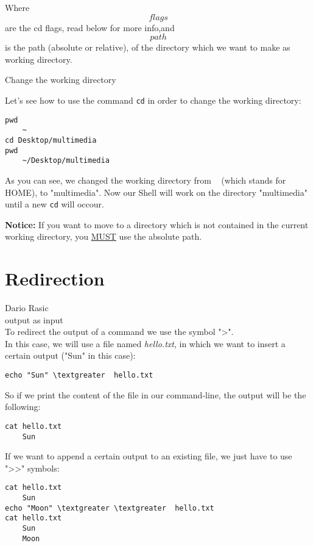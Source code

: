 \documentclass[hidelinks,12pt,a4paper,numbers=enddot]{scrartcl}
\begin{document}
Where \[flags\] are the cd flags, read below for more info,and \[path\] is the
path (absolute or relative), of the directory which we  want to make as working directory.


Change the working directory


Let's see how to use the command \texttt{cd} in order to change the working directory:


\begin{verbatim}
pwd
    ~
cd Desktop/multimedia
pwd
    ~/Desktop/multimedia
\end{verbatim}



As you can see, we changed the working directory from ~ (which stands for HOME),
to "multimedia". Now our Shell will work on the  directory "multimedia"
until a new \texttt{cd} will occour.



\textbf{Notice:} If you want to move to a directory which is not contained in the
current working directory, you \underline{MUST} use the absolute path.


\section{Redirection}


\large Dario Rasic \normalsize\\


output as input
\\
To redirect the output of a command we use the symbol "\textgreater ".\\

In this case, we will use a file named \emph{hello.txt}, in which we want to insert
a certain output ("Sun" in this case):\\

\begin{verbatim}
echo "Sun" \textgreater  hello.txt
\end{verbatim}

So if we print the content of the file in our command-line, the output will be the following:

\begin{verbatim}
cat hello.txt
    Sun
\end{verbatim}

If we want to append a certain output to an existing file,
we just have to use "\textgreater \textgreater " symbols:

\begin{verbatim}
cat hello.txt
    Sun
echo "Moon" \textgreater \textgreater  hello.txt
cat hello.txt
    Sun
    Moon
\end{verbatim}
\end{document}
